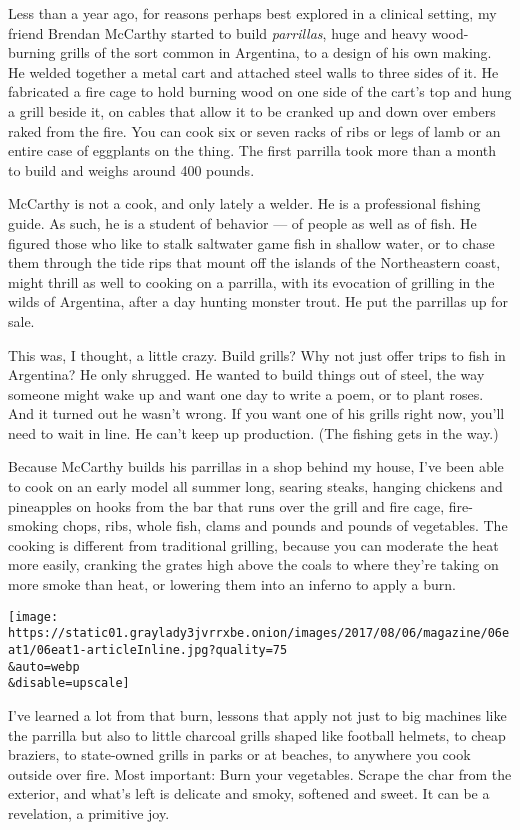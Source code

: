 Less than a year ago, for reasons perhaps best explored in a clinical
setting, my friend Brendan McCarthy started to build \emph{parrillas},
huge and heavy wood-burning grills of the sort common in Argentina, to a
design of his own making. He welded together a metal cart and attached
steel walls to three sides of it. He fabricated a fire cage to hold
burning wood on one side of the cart's top and hung a grill beside it,
on cables that allow it to be cranked up and down over embers raked from
the fire. You can cook six or seven racks of ribs or legs of lamb or an
entire case of eggplants on the thing. The first parrilla took more than
a month to build and weighs around 400 pounds.

McCarthy is not a cook, and only lately a welder. He is a professional
fishing guide. As such, he is a student of behavior --- of people as
well as of fish. He figured those who like to stalk saltwater game fish
in shallow water, or to chase them through the tide rips that mount off
the islands of the Northeastern coast, might thrill as well to cooking
on a parrilla, with its evocation of grilling in the wilds of Argentina,
after a day hunting monster trout. He put the parrillas up for sale.

This was, I thought, a little crazy. Build grills? Why not just offer
trips to fish in Argentina? He only shrugged. He wanted to build things
out of steel, the way someone might wake up and want one day to write a
poem, or to plant roses. And it turned out he wasn't wrong. If you want
one of his grills right now, you'll need to wait in line. He can't keep
up production. (The fishing gets in the way.)

Because McCarthy builds his parrillas in a shop behind my house, I've
been able to cook on an early model all summer long, searing steaks,
hanging chickens and pineapples on hooks from the bar that runs over the
grill and fire cage, fire-smoking chops, ribs, whole fish, clams and
pounds and pounds of vegetables. The cooking is different from
traditional grilling, because you can moderate the heat more easily,
cranking the grates high above the coals to where they're taking on more
smoke than heat, or lowering them into an inferno to apply a burn.

\texttt{[image: https://static01.graylady3jvrrxbe.onion/images/2017/08/06/magazine/06eat1/06eat1-articleInline.jpg?quality=75\\\&auto=webp\\\&disable=upscale]}

I've learned a lot from that burn, lessons that apply not just to big
machines like the parrilla but also to little charcoal grills shaped
like football helmets, to cheap braziers, to state-owned grills in parks
or at beaches, to anywhere you cook outside over fire. Most important:
Burn your vegetables. Scrape the char from the exterior, and what's left
is delicate and smoky, softened and sweet. It can be a revelation, a
primitive joy.


